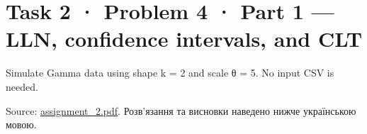 \documentclass[11pt]{article}
\title{}
\begin{document}
    
    \maketitle
    
    

    
    \section{Task 2 · Problem 4 · Part 1 --- LLN, confidence intervals, and
CLT}\label{task-2-problem-4-part-1-lln-confidence-intervals-and-clt}

Simulate Gamma data using shape k = 2 and scale θ = 5. No input CSV is
needed.

Source: \href{../../../input/assignment_2.pdf}{assignment\_2.pdf}. Розв'язання
та висновки наведено нижче українською мовою.
\end{document}

